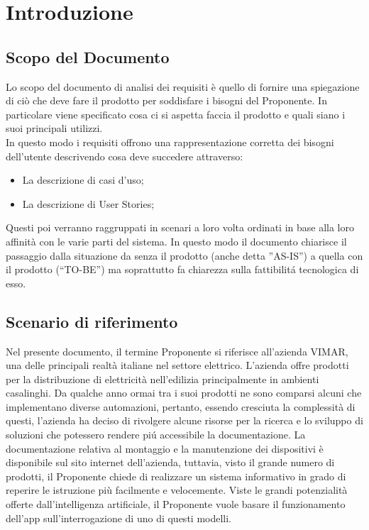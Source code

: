 \section{Introduzione}
\subsection{Scopo del Documento}
Lo scopo del documento di analisi dei requisiti è quello di fornire una spiegazione di ciò che deve fare il prodotto per soddisfare i bisogni del Proponente. In particolare viene specificato cosa ci si aspetta faccia il prodotto e quali siano i suoi principali utilizzi. \\
In questo modo i requisiti offrono una rappresentazione corretta dei bisogni dell’utente descrivendo cosa deve succedere attraverso:
\begin{itemize}
    \item La descrizione di casi d’uso;
    \item La descrizione di User Stories;
\end{itemize}
Questi poi verranno raggruppati in scenari a loro volta ordinati in base alla loro affinità con le varie parti del sistema. In questo modo il documento chiarisce il passaggio dalla situazione da senza il prodotto (anche detta ”AS-IS”) a quella con il prodotto (“TO-BE”) ma soprattutto fa chiarezza sulla fattibilitá tecnologica di esso.

\subsection{Scenario di riferimento} 
Nel presente documento, il termine Proponente si riferisce all'azienda VIMAR, una delle principali realtà italiane nel settore elettrico. L’azienda offre prodotti per la distribuzione di elettricità nell’edilizia principalmente in ambienti casalinghi. Da qualche anno ormai tra i suoi prodotti ne sono comparsi alcuni che implementano diverse automazioni, pertanto, essendo cresciuta la complessità di questi, l’azienda ha deciso di rivolgere alcune risorse per la ricerca e lo sviluppo di soluzioni che potessero rendere piú accessibile la documentazione. La documentazione relativa al montaggio e la manutenzione dei dispositivi è disponibile sul sito internet dell’azienda, tuttavia, visto il grande numero di prodotti, il Proponente chiede di realizzare un sistema informativo in grado di reperire le istruzione più facilmente e velocemente. Viste le grandi potenzialità offerte dall’intelligenza artificiale, il Proponente vuole basare il funzionamento dell’app sull’interrogazione di uno di questi modelli.

